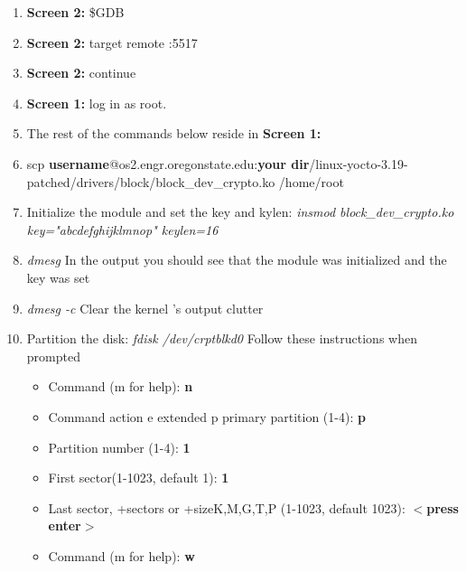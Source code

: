\documentclass[draftclsnofoot, onecolumn, 10pt, compsoc]{IEEEtran}
\begin{document}
\begin{enumerate}
\begin{enumerate}
					\item \textbf{Screen 2:} \$GDB
					
					\item \textbf{Screen 2:} target remote :5517
					
					\item \textbf{Screen 2:} continue
					
					\item \textbf{Screen 1:} log in as root.
					
					\item The rest of the commands below reside in \textbf{Screen 1:}
					
					\item{scp \textbf{username}@os2.engr.oregonstate.edu:\textbf{your dir}/linux-yocto-3.19-patched/drivers/block/block\_dev\_crypto.ko /home/root}
					
					\item{Initialize the module and set the key and kylen: \textit{insmod block\_dev\_crypto.ko key="abcdefghijklmnop" keylen=16}}
					
					\item \textit{dmesg} In the output you should see that the module was initialized and the key was set
					
					\item \textit{dmesg -c} Clear the kernel 's output clutter
					
					\item Partition the disk:\textit{ fdisk /dev/crptblkd0}
						Follow these instructions when prompted
						\begin{itemize}
							\item Command (m for help): \textbf{n}
					
							\item Command action  e extended  p primary partition (1-4): \textbf{p}
					
							\item Partition number (1-4): \textbf{1}
					
							\item First sector(1-1023, default 1): \textbf{1}
					
							\item Last sector, +sectors or +size{K,M,G,T,P} (1-1023, default 1023): \textbf{$<$press enter$>$}
					
							\item Command (m for help): \textbf{w}
						\end{itemize}
					

\end{enumerate}
\end{enumerate}
\end{document}
